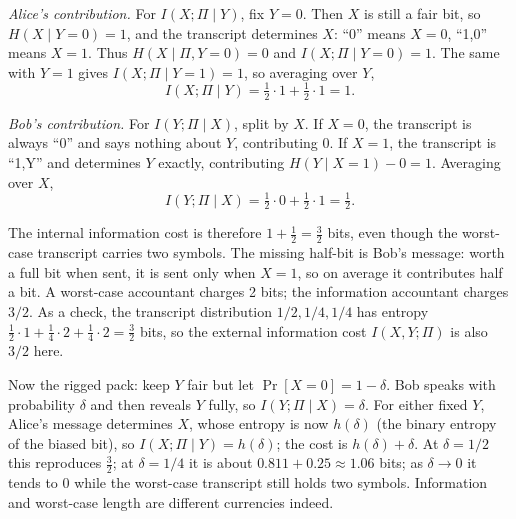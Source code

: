 \emph{Alice's contribution.} For $I(X;\Pi\mid Y)$, fix $Y=0$. Then $X$ is still a fair bit, so $H(X\mid Y=0)=1$, and the transcript determines $X$: ``0'' means $X=0$, ``1,0'' means $X=1$. Thus $H(X\mid \Pi,Y=0)=0$ and $I(X;\Pi\mid Y=0)=1$. The same with $Y=1$ gives $I(X;\Pi\mid Y=1)=1$, so averaging over $Y$,
\[
I(X;\Pi\mid Y)=\tfrac12\cdot 1+\tfrac12\cdot 1=1.
\]

\emph{Bob's contribution.} For $I(Y;\Pi\mid X)$, split by $X$. If $X=0$, the transcript is always ``0'' and says nothing about $Y$, contributing 0. If $X=1$, the transcript is ``1,Y'' and determines $Y$ exactly, contributing $H(Y\mid X=1)-0=1$. Averaging over $X$,
\[
I(Y;\Pi\mid X)=\tfrac12\cdot 0+\tfrac12\cdot 1=\tfrac12.
\]

The internal information cost is therefore $1+\tfrac12=\tfrac32$ bits, even though the worst-case transcript carries two symbols. The missing half-bit is Bob's message: worth a full bit when sent, it is sent only when $X=1$, so on average it contributes half a bit. A worst-case accountant charges 2 bits; the information accountant charges $3/2$. As a check, the transcript distribution $1/2,1/4,1/4$ has entropy $\tfrac12\cdot1+\tfrac14\cdot2+\tfrac14\cdot2=\tfrac32$ bits, so the external information cost $I(X,Y;\Pi)$ is also $3/2$ here.

Now the rigged pack: keep $Y$ fair but let $\Pr[X=0]=1-\delta$. Bob speaks with probability $\delta$ and then reveals $Y$ fully, so $I(Y;\Pi\mid X)=\delta$. For either fixed $Y$, Alice's message determines $X$, whose entropy is now $h(\delta)$ (the binary entropy of the biased bit), so $I(X;\Pi\mid Y)=h(\delta)$; the cost is $h(\delta)+\delta$. At $\delta=1/2$ this reproduces $\tfrac32$; at $\delta=1/4$ it is about $0.811+0.25\approx1.06$ bits; as $\delta\to0$ it tends to $0$ while the worst-case transcript still holds two symbols. Information and worst-case length are different currencies indeed.

